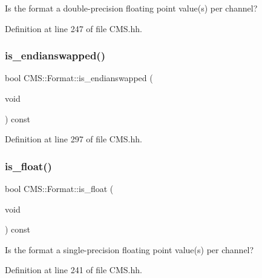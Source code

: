 Is the format a double-\/precision floating point value(s) per channel? 



Definition at line 247 of file C\+M\+S.\+hh.

\mbox{\label{class_c_m_s_1_1_format_a738bc50d2f6d18bca81708d3832dba97}} 
\subsubsection{\texorpdfstring{is\+\_\+endianswapped()}{is\_endianswapped()}}
{\footnotesize\ttfamily bool C\+M\+S\+::\+Format\+::is\+\_\+endianswapped (\begin{DoxyParamCaption}\item[{void}]{ }\end{DoxyParamCaption}) const\hspace{0.3cm}{\ttfamily [inline]}}



Definition at line 297 of file C\+M\+S.\+hh.

\mbox{\label{class_c_m_s_1_1_format_afac9e92aa35a0f3e6cbaf88a42c15227}} 
\subsubsection{\texorpdfstring{is\+\_\+float()}{is\_float()}}
{\footnotesize\ttfamily bool C\+M\+S\+::\+Format\+::is\+\_\+float (\begin{DoxyParamCaption}\item[{void}]{ }\end{DoxyParamCaption}) const\hspace{0.3cm}{\ttfamily [inline]}}



Is the format a single-\/precision floating point value(s) per channel? 



Definition at line 241 of file C\+M\+S.\+hh.

\mbox{\label{class_c_m_s_1_1_format_a33483e2dede190c65351d43a9488abe4}} 
